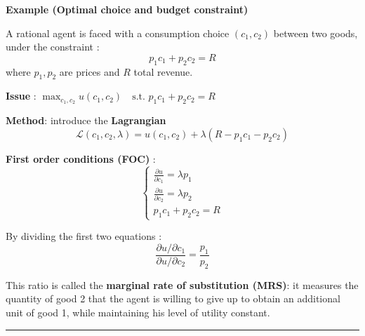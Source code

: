 \begin{f}
		\textbf{Example (Optimal choice and budget constraint)}
	
	A rational agent is faced with a consumption choice \((c_1, c_2)\) between two goods, under the constraint :
	\[
	p_1 c_1 + p_2 c_2 = R
	\]
	where \(p_1, p_2\) are prices and \(R\) total revenue.
	
	\textbf{Issue} :
	\(
	\max_{c_1, c_2} u(c_1, c_2) \quad \text{s.t. } p_1 c_1 + p_2 c_2 = R\)

	
	\textbf{Method}: introduce the \textbf{Lagrangian}
	\[
	\mathcal{L}(c_1, c_2, \lambda) = u(c_1, c_2) + \lambda (R - p_1 c_1 - p_2 c_2)
	\]
	
	\textbf{First order conditions (FOC)} :
	\[
	\begin{cases}
		\frac{\partial u}{\partial c_1} = \lambda p_1 \\
		\frac{\partial u}{\partial c_2} = \lambda p_2 \\
		p_1 c_1 + p_2 c_2 = R
	\end{cases}
	\]
	
	By dividing the first two equations :
	\[
	\frac{\partial u / \partial c_1}{\partial u / \partial c_2} = \frac{p_1}{p_2}
	\]
	
	This ratio is called the \textbf{marginal rate of substitution (MRS)}: it measures the quantity of good 2 that the agent is willing to give up to obtain an additional unit of good 1, while maintaining his level of utility constant.
	
\end{f}
\hrule

